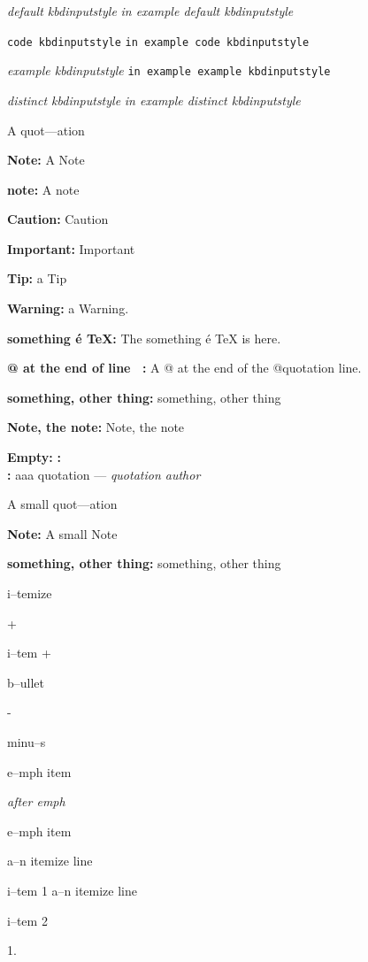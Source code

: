 \documentclass{book}
\begin{document}
{\ttfamily\textsl{default kbdinputstyle}}
{\ttfamily\textsl{in example default kbdinputstyle}}

\texttt{code kbdinputstyle}
\texttt{in example code kbdinputstyle}

{\ttfamily\textsl{example kbdinputstyle}}
\texttt{in example example kbdinputstyle}

{\ttfamily\textsl{distinct kbdinputstyle}}
{\ttfamily\textsl{in example distinct kbdinputstyle}}

A quot---ation

\textbf{Note:} A Note

\textbf{note:} A note

\textbf{Caution:} Caution

\textbf{Important:} Important

\textbf{Tip:} a Tip

\textbf{Warning:} a Warning.

\textbf{something \'{e} \TeX{}:} The something \'{e} \TeX{} is here.

\textbf{@ at the end of line \ {}:} A @ at the end of the @quotation line.

\textbf{something, other thing:} something, other thing

\textbf{Note, the note:} Note, the note


\textbf{Empty:} 
\textbf{:} 
\textbf{\leavevmode{}\\:} 
aaa quotation
--- \emph{quotation author}

A small quot---ation

\textbf{Note:} A small Note

\textbf{something, other thing:} something, other thing

\textbullet{} 

i--temize

+ 

i--tem +

\textbullet{} 

b--ullet

- 

minu--s

\emph{} 

e--mph item

\emph{after emph} 

e--mph item

\textbullet{} a--n itemize line 

i--tem 1
\textbullet{} a--n itemize line 

i--tem 2

1. 
\end{document}

